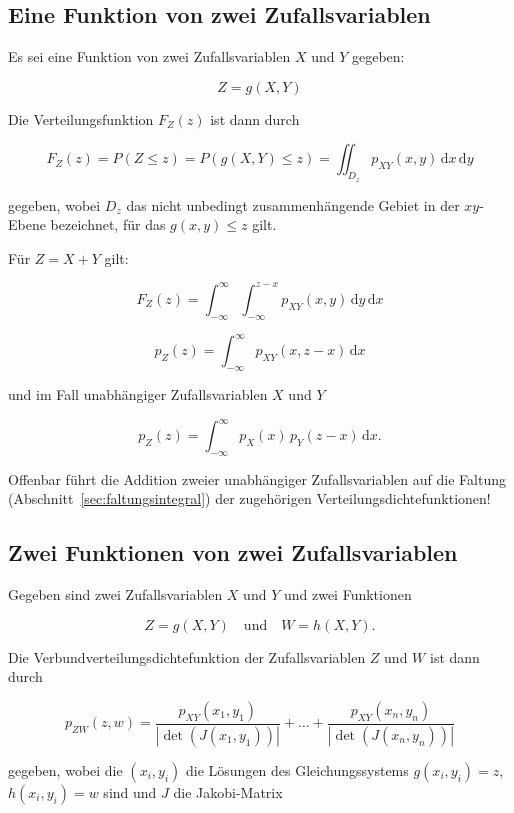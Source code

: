 \subsection{Eine Funktion von zwei Zufallsvariablen}
\label{sec:funktion-zwei-zv}

Es sei eine Funktion von zwei Zufallsvariablen $X$ und $Y$ gegeben:

$$
Z = g(X, Y)
$$

Die Verteilungsfunktion $F_Z(z)$ ist dann durch

$$
F_Z(z) = P(Z \leq z) = P(g(X,Y) \leq z) = \iint_{D_z} p_{XY}(x,y)\,\mathrm{d}x\,\mathrm{d}y
$$

gegeben, wobei $D_z$ das nicht unbedingt zusammenhängende Gebiet in der $xy$-Ebene bezeichnet, für das $g(x,y) \leq z$ gilt.

\begin{beispiel}
Für $Z = X + Y$ gilt:


$$
F_Z(z) = \int_{-\infty}^{\infty} \int_{-\infty}^{z-x} p_{XY}(x,y)\,\mathrm{d}y\,\mathrm{d}x
$$

$$
p_Z(z) = \int_{-\infty}^{\infty} p_{XY}(x, z-x)\,\mathrm{d}x
$$

und im Fall unabhängiger Zufallsvariablen $X$ und $Y$

$$
p_Z(z) = \int_{-\infty}^{\infty} p_X(x)\,p_Y(z-x)\,\mathrm{d}x.
$$

Offenbar führt die Addition zweier unabhängiger Zufallsvariablen auf die Faltung (Abschnitt~\ref{sec:faltungsintegral}) der zugehörigen Verteilungsdichtefunktionen!
\end{beispiel}

\subsection{Zwei Funktionen von zwei Zufallsvariablen}
\label{sec:zwei-funktionen-zwei-zv}

Gegeben sind zwei Zufallsvariablen $X$ und $Y$ und zwei Funktionen

$$
Z = g(X, Y) \quad \text{und} \quad W = h(X, Y).
$$

Die Verbundverteilungsdichtefunktion der Zufallsvariablen $Z$ und $W$ ist dann durch

$$
p_{ZW}(z,w) = \frac{p_{XY}(x_1, y_1)}{|\det(J(x_1, y_1))|} + \ldots + \frac{p_{XY}(x_n, y_n)}{|\det(J(x_n, y_n))|}
$$

gegeben, wobei die $(x_i, y_i)$ die Lösungen des Gleichungssystems $g(x_i, y_i) = z$, $h(x_i, y_i) = w$ sind und $J$ die Jakobi-Matrix

